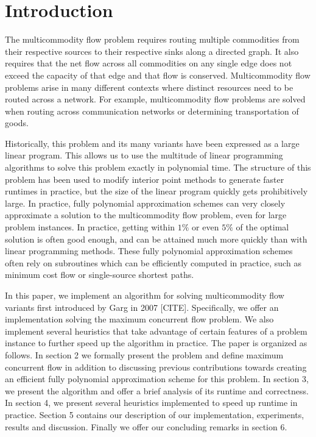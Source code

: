 \section{Introduction}

The multicommodity flow problem requires routing multiple commodities
from their respective sources to their respective sinks along a
directed graph. It also requires that the net flow across all commodities on any
single edge does not exceed the capacity of that edge and that flow is conserved. Multicommodity
flow problems arise in many different contexts where distinct
resources need to be routed across a network. For example,
multicommodity flow problems are solved when routing across
communication networks or determining transportation of goods.

Historically, this problem and its many variants have been expressed as a
large linear program. This allows us to use the multitude of linear programming 
algorithms to solve this problem exactly in polynomial time. The
structure of this problem has been used to modify
interior point methods to generate faster runtimes in practice, but
the size of the linear program quickly gets prohibitively large. In
practice, fully polynomial approximation schemes can very closely
approximate a solution to the multicommodity flow problem, even for
large problem instances. In practice, getting within $1\%$ or even
$5\%$ of the optimal solution is often good enough, and can be
attained much more quickly than with linear
programming methods. These fully polynomial approximation schemes
often rely on subroutines which can be efficiently computed in
practice, such as minimum cost flow or single-source shortest paths.

In this paper, we implement an algorithm for solving multicommodity
flow variants first introduced by Garg in 2007 [CITE].%
Specifically, we offer
an implementation solving the maximum concurrent flow problem. We also
implement several heuristics that take advantage of certain features
of a problem instance to further speed up the algorithm in
practice. The paper is organized as follows. In section 2
we formally present the problem and define maximum concurrent flow in
addition to discussing previous contributions towards creating an
efficient fully polynomial approximation scheme for this problem. In
section 3, we present the algorithm and offer a brief analysis of its
runtime and correctness. In section 4, we present several heuristics
implemented to speed up runtime in practice. Section 5 contains our
description of our implementation, experiments, results and
discussion.  Finally we offer our concluding remarks in section 6.


